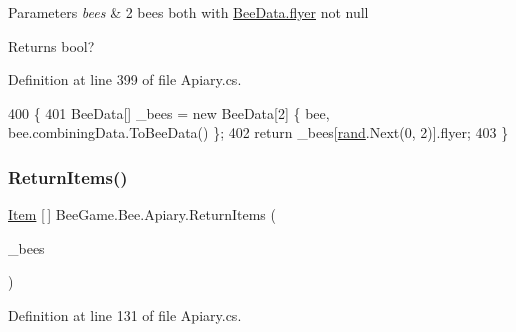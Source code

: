 \begin{DoxyParams}{Parameters}
{\em bees} & 2 bees both with \hyperlink{struct_bee_game_1_1_bee_1_1_bee_data_af78a352321613693c3e94c98f655ac63}{Bee\+Data.\+flyer} not null\\
\hline
\end{DoxyParams}
\begin{DoxyReturn}{Returns}
bool?
\end{DoxyReturn}


Definition at line 399 of file Apiary.\+cs.


\begin{DoxyCode}
400         \{
401             BeeData[] \_bees = \textcolor{keyword}{new} BeeData[2] \{ bee, bee.combiningData.ToBeeData() \};
402             \textcolor{keywordflow}{return} \_bees[\hyperlink{class_bee_game_1_1_bee_1_1_apiary_a272ac8b385ad3a7cd358b0959d561be7}{rand}.Next(0, 2)].flyer;
403         \}
\end{DoxyCode}
\mbox{\label{class_bee_game_1_1_bee_1_1_apiary_abb65875e61a806c8b2787d0c7d8229bd}} 
\subsubsection{\texorpdfstring{Return\+Items()}{ReturnItems()}}
{\footnotesize\ttfamily \hyperlink{struct_bee_game_1_1_items_1_1_item}{Item} \mbox{[}$\,$\mbox{]} Bee\+Game.\+Bee.\+Apiary.\+Return\+Items (\begin{DoxyParamCaption}\item[{\hyperlink{struct_bee_game_1_1_bee_1_1_bee_data}{Bee\+Data} \mbox{[}$\,$\mbox{]}}]{\+\_\+bees }\end{DoxyParamCaption})\hspace{0.3cm}{\ttfamily [private]}}



Definition at line 131 of file Apiary.\+cs.


